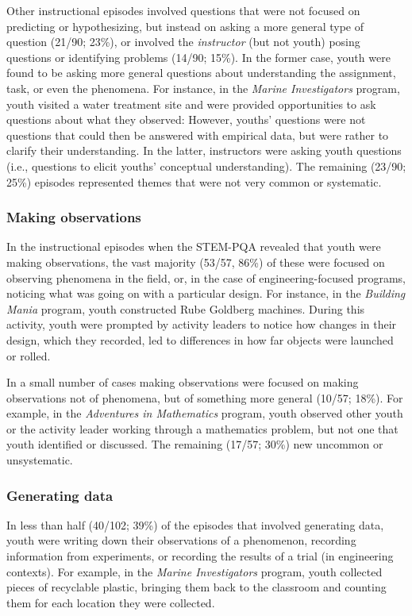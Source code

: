 \documentclass[]{msu-thesis}
\theoremstyle{definition}
\theoremstyle{definition}
\theoremstyle{definition}
\theoremstyle{remark}
\begin{document}
Other instructional episodes involved questions that were not focused on
predicting or hypothesizing, but instead on asking a more general type
of question (21/90; 23\%), or involved the \emph{instructor} (but not
youth) posing questions or identifying problems (14/90; 15\%). In the
former case, youth were found to be asking more general questions about
understanding the assignment, task, or even the phenomena. For instance,
in the \emph{Marine Investigators} program, youth visited a water
treatment site and were provided opportunities to ask questions about
what they observed: However, youths' questions were not questions that
could then be answered with empirical data, but were rather to clarify
their understanding. In the latter, instructors were asking youth
questions (i.e., questions to elicit youths' conceptual understanding).
The remaining (23/90; 25\%) episodes represented themes that were not
very common or systematic.

\subsubsection{Making observations}\label{making-observations}

In the instructional episodes when the STEM-PQA revealed that youth were
making observations, the vast majority (53/57, 86\%) of these were
focused on observing phenomena in the field, or, in the case of
engineering-focused programs, noticing what was going on with a
particular design. For instance, in the \emph{Building Mania} program,
youth constructed Rube Goldberg machines. During this activity, youth
were prompted by activity leaders to notice how changes in their design,
which they recorded, led to differences in how far objects were launched
or rolled.

In a small number of cases making observations were focused on making
observations not of phenomena, but of something more general (10/57;
18\%). For example, in the \emph{Adventures in Mathematics} program,
youth observed other youth or the activity leader working through a
mathematics problem, but not one that youth identified or discussed. The
remaining (17/57; 30\%) new uncommon or unsystematic.

\subsubsection{Generating data}\label{generating-data}

In less than half (40/102; 39\%) of the episodes that involved
generating data, youth were writing down their observations of a
phenomenon, recording information from experiments, or recording the
results of a trial (in engineering contexts). For example, in the
\emph{Marine Investigators} program, youth collected pieces of
recyclable plastic, bringing them back to the classroom and counting
them for each location they were collected.
\end{document}
